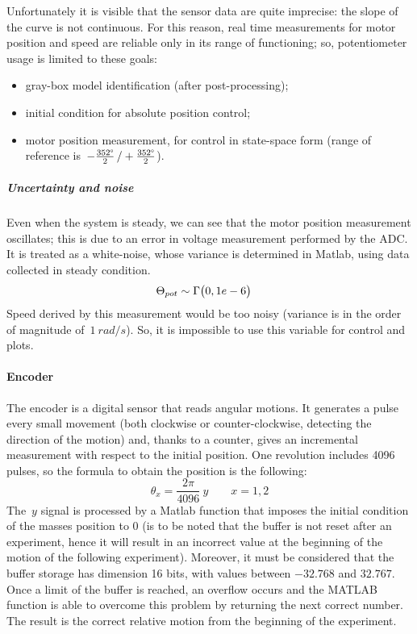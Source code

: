 Unfortunately it is visible that the sensor data are quite imprecise: the slope of the curve is not continuous. For this reason, real time measurements for motor position and speed are reliable only in its range of functioning; so, potentiometer usage is limited to these goals:

\begin{itemize}
	\item gray-box model identification (after post-processing);
	\item initial condition for absolute position control;
	\item motor position measurement, for control in state-space form (range of reference is~$-\frac{352 \degree}{2} \, / +\frac{352 \degree}{2}$).
\end{itemize}

\subparagraph{Uncertainty and noise}
Even when the system is steady, we can see that the motor position measurement oscillates; this is due to an error in voltage measurement performed by the ADC. It is treated as a white-noise, whose variance is determined in Matlab, using data collected in steady condition.
\begin{align*}
	\Theta_{pot} &\sim \Gamma \bigl{(} 0, 1e-6 \bigr{)}
\end{align*}
Speed derived by this measurement would be too noisy (variance is in the order of magnitude of~$1\ rad/s$). So, it is impossible to use this variable for control and plots.

\paragraph{Encoder}

The encoder is a digital sensor that reads angular motions. It generates a pulse every small movement (both clockwise or counter-clockwise, detecting the direction of the motion) and, thanks to a counter, gives an incremental measurement with respect to the initial position. One revolution includes 4096 pulses, so the formula to obtain the position is the following:
\[
	\theta_x = \frac{2\pi}{4096} \ y \qquad x={1,2}
\]
The~$y$ signal is processed by a Matlab function that imposes the initial condition of the masses position to 0 (is to be noted that the buffer is not reset after an experiment, hence it will result in an incorrect value at the beginning of the motion of the following experiment). Moreover, it must be considered that the buffer storage has dimension 16 bits, with values between $-32.768$ and $32.767$. Once a limit of the buffer is reached, an overflow occurs and the MATLAB function is able to overcome this problem by returning the next correct number. The result is the correct relative motion from the beginning of the experiment.

